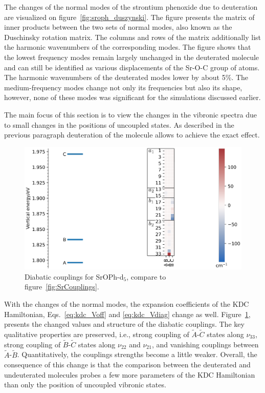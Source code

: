 \documentclass{article}
\begin{document}
The changes of the normal modes of the strontium phenoxide due to deuteration
are visualized on figure~\ref{fig:sroph_duszynski}. The figure presents the
matrix of inner products between the two sets of normal modes, also known as
the Duschinsky rotation matrix. The columns and rows of the matrix additionally
list the harmonic wavenumbers of the corresponding modes. The figure shows
that the lowest frequency modes remain largely unchanged in the deuterated
molecule and can still be identified as various displacements of the Sr-O-C
group of atoms. The harmonic wavenumbers of the deuterated modes lower by
about 5\%. The medium-frequency modes change not only its frequencies but also
its shape, however, none of these modes was significant for the simulations
discussed earlier.

The main focus of this section is to view the changes in the vibronic spectra
due to small changes in the positions of uncoupled states. As described in the
previous paragraph deuteration of the molecule allows to achieve the exact
effect.

\begin{figure}
    \begin{center}
        \includegraphics[width=12 cm]{./figures/SrOPh5dCouplings.pdf}
    \end{center}
    \caption{
        Diabatic couplings for SrOPh-d$_5$, compare to
        figure~\ref{fig:SrCouplings}.
    }
    \label{fig:srd5_couplings}
\end{figure}

With the changes of the normal modes, the expansion coefficients of the KDC
Hamiltonian, Eqs.~\eqref{eq:kdc_Voff} and \eqref{eq:kdc_Vdiag} change as well.
Figure~\ref{fig:srd5_couplings}, presents the changed values and structure of
the diabatic couplings. The key qualitative properties are preserved, i.e.,
strong coupling of $\tilde{A}$-$\tilde{C}$ states along $\nu _{33}$, strong
coupling of $\tilde{B}$-$\tilde{C}$ states along $\nu _{22}$ and $\nu _{21}$,
and vanishing couplings between $\tilde{A}$-$\tilde{B}$. Quantitatively, the
couplings strengths become a little weaker. Overall, the consequence of this
change is that the comparison between the deuterated and undeuterated molecules
probes a few more parameters of the KDC Hamiltonian than only the position of
uncoupled vibronic states.
\end{document}
